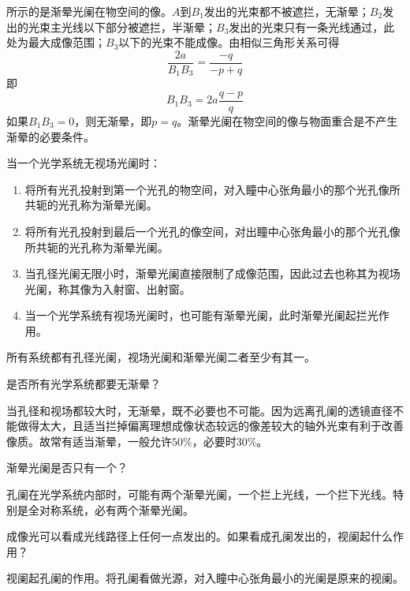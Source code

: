 \documentclass[cn,10pt,chinesefont=founder,math=newtx,cite=super,twoside]{elegantbook}
\begin{document}
 所示的是渐晕光阑在物空间的像。$A$到$B_1$发出的光束都不被遮拦，无渐晕；$B_2$发出的光束主光线以下部分被遮拦，半渐晕；$B_3$发出的光束只有一条光线通过，此处为最大成像范围；$B_3$以下的光束不能成像。由相似三角形关系可得
\begin{equation}
\frac{2a}{B_1B_3}=\frac{-q}{-p+q}
\end{equation}
即
\begin{equation}
B_1B_3=2a\frac{q-p}{q}
\end{equation}
如果$B_1B_3=0$，则无渐晕，即$p=q$。渐晕光阑在物空间的像与物面重合是不产生渐晕的必要条件。

\begin{note}当一个光学系统无视场光阑时：
	\begin{enumerate}
		\item 将所有光孔投射到第一个光孔的物空间，对入瞳中心张角最小的那个光孔像所共轭的光孔称为渐晕光阑。
		\item 将所有光孔投射到最后一个光孔的像空间，对出瞳中心张角最小的那个光孔像所共轭的光孔称为渐晕光阑。
		\item 当孔径光阑无限小时，渐晕光阑直接限制了成像范围，因此过去也称其为视场光阑，称其像为入射窗、出射窗。
		\item 当一个光学系统有视场光阑时，也可能有渐晕光阑，此时渐晕光阑起拦光作用。
	\end{enumerate}
\end{note}

\begin{remark}
	所有系统都有孔径光阑，视场光阑和渐晕光阑二者至少有其一。
\end{remark}

\begin{problem}
	是否所有光学系统都要无渐晕？
\end{problem}
\begin{solution}
	当孔径和视场都较大时，无渐晕，既不必要也不可能。因为远离孔阑的透镜直径不能做得太大，且适当拦掉偏离理想成像状态较远的像差较大的轴外光束有利于改善像质。故常有适当渐晕，一般允许$50\%$，必要时$30\%$。
\end{solution}

\begin{problem}
	渐晕光阑是否只有一个？
\end{problem}
\begin{solution}
	孔阑在光学系统内部时，可能有两个渐晕光阑，一个拦上光线，一个拦下光线。特别是全对称系统，必有两个渐晕光阑。
\end{solution}

\begin{problem}
	成像光可以看成光线路径上任何一点发出的。如果看成孔阑发出的，视阑起什么作用？
\end{problem}
\begin{solution}
	视阑起孔阑的作用。将孔阑看做光源，对入瞳中心张角最小的光阑是原来的视阑。
\end{solution}
\end{document}
